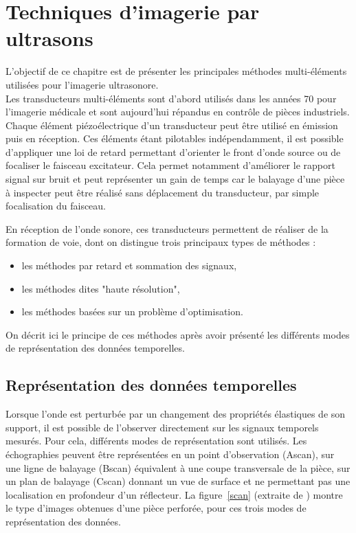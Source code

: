 \chapter{Techniques d'imagerie par ultrasons}

 L'objectif de ce chapitre est de présenter les principales méthodes multi-éléments utilisées pour l'imagerie ultrasonore. \\

Les transducteurs multi-éléments sont d'abord utilisés dans les années 70 pour l'imagerie médicale et sont aujourd'hui répandus en contrôle de pièces industriels.\\

Chaque élément piézoélectrique d'un transducteur peut être utilisé en émission puis en réception. Ces éléments étant pilotables indépendamment, il est possible d'appliquer une loi de retard permettant d'orienter le front d'onde source ou de focaliser le faisceau excitateur. Cela permet notamment d'améliorer le rapport signal sur bruit et peut représenter un gain de temps car le balayage d'une pièce à inspecter peut être réalisé sans déplacement du transducteur, par simple focalisation du faisceau.

En réception de l'onde sonore, ces transducteurs permettent de réaliser de la formation de voie, dont on distingue trois principaux types de méthodes : 
\begin{itemize}
	\item les méthodes par retard et sommation des signaux,
	\item les méthodes dites "haute résolution",
	\item les méthodes basées sur un problème d'optimisation.
\end{itemize} 

On décrit ici le principe de ces méthodes après avoir présenté les différents modes de représentation des données temporelles.




\section{Représentation des données temporelles}

Lorsque l'onde est perturbée par un changement des propriétés élastiques de son support, il est possible de l'observer directement sur les signaux temporels mesurés. Pour cela, différents modes de représentation sont utilisés. Les échographies peuvent être représentées en un point d'observation (Ascan), sur une ligne de balayage (Bscan) équivalent à une coupe transversale de la pièce,  sur un plan de balayage (Cscan) donnant un vue de surface et ne permettant pas une localisation en profondeur d'un réflecteur. La figure~\ref{scan} (extraite de \cite{bannouf}) montre le type d'images obtenues d'une pièce perforée, pour ces trois modes de représentation des données. \\
 
